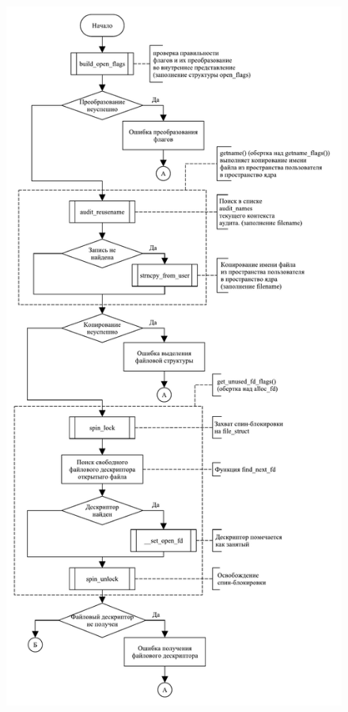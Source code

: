 \begin{figure}[H]
    \centering
    \includegraphics[scale=0.55]{../schema/open_01.pdf}
\end{figure}

